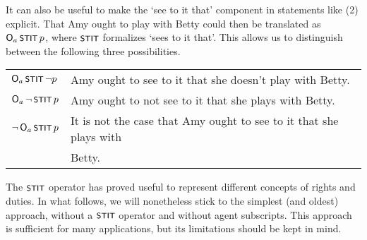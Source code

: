 It can also be useful to make the `see to it that' component in statements like
(2) explicit. That Amy ought to play with Betty could then be translated as
$\Ob_a \stit p$, where $\stit$ formalizes `sees to it that'. This allows us to
distinguish between the following three possibilities.

\bigskip
\begin{tabular}{ll}
  $\Ob_a \stit \neg p$ & Amy ought to see to it that she doesn't play with Betty.\\
  $\Ob_a \neg \stit p$ & Amy ought to not see to it that she plays with Betty.\\
  $\neg \Ob_a \stit p$ & It is not the case that Amy ought to see to it that she plays with\\[-0.5mm]
                       & Betty.
\end{tabular}
\bigskip



The $\stit$ operator has proved useful to represent different concepts of rights
and duties. In what follows, we will nonetheless stick to the simplest (and
oldest) approach, without a $\stit$ operator and without agent subscripts. This
approach is sufficient for many applications, but its limitations should be kept
in mind.


